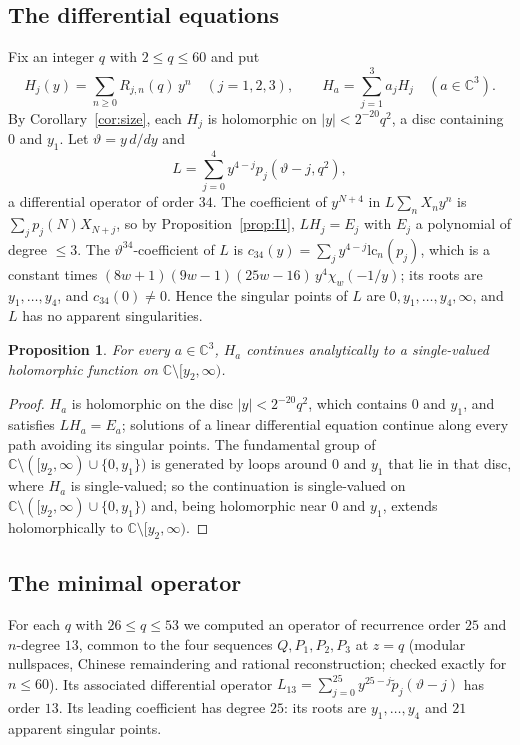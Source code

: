 \documentclass[11pt]{amsart}
\newtheorem{proposition}{Proposition}[section]
\theoremstyle{definition}
\theoremstyle{remark}
\numberwithin{equation}{section}
\newcommand{\CC}{\mathbb{C}}
\begin{document}
\subsection{The differential equations}
Fix an integer $q$ with $2\le q\le60$ and put
\[
H_j(y)=\sum_{n\ge0}R_{j,n}(q)\,y^n\quad(j=1,2,3),\qquad H_a=\sum_{j=1}^3a_jH_j\quad(a\in\CC^3).
\]
By Corollary~\ref{cor:size}, each $H_j$ is holomorphic on $|y|<2^{-20}q^2$, a disc containing $0$ and $y_1$. Let
$\vartheta=y\,d/dy$ and
\[
L=\sum_{j=0}^4y^{4-j}p_j(\vartheta-j,q^2),
\]
a differential operator of order $34$. The coefficient of $y^{N+4}$ in $L\sum_nX_ny^n$ is $\sum_jp_j(N)X_{N+j}$, so by
Proposition~\ref{prop:I1}, $LH_j=E_j$ with $E_j$ a polynomial of degree $\le3$. The $\vartheta^{34}$-coefficient of $L$
is $c_{34}(y)=\sum_jy^{4-j}\mathrm{lc}_n(p_j)$, which is a constant times $(8w+1)(9w-1)(25w-16)\,y^4\chi_w(-1/y)$; its
roots are $y_1,\dots,y_4$, and $c_{34}(0)\ne0$. Hence the singular points of $L$ are $0,y_1,\dots,y_4,\infty$, and $L$ has
no apparent singularities.

\begin{proposition}\label{prop:continuation}
For every $a\in\CC^3$, $H_a$ continues analytically to a single-valued holomorphic function on $\CC\setminus[y_2,\infty)$.
\end{proposition}

\begin{proof}
$H_a$ is holomorphic on the disc $|y|<2^{-20}q^2$, which contains $0$ and $y_1$, and satisfies $LH_a=E_a$; solutions of a
linear differential equation continue along every path avoiding its singular points. The fundamental group of
$\CC\setminus([y_2,\infty)\cup\{0,y_1\})$ is generated by loops around $0$ and $y_1$ that lie in that disc, where $H_a$ is
single-valued; so the continuation is single-valued on $\CC\setminus([y_2,\infty)\cup\{0,y_1\})$ and, being holomorphic
near $0$ and $y_1$, extends holomorphically to $\CC\setminus[y_2,\infty)$.
\end{proof}

\subsection{The minimal operator}
For each $q$ with $26\le q\le53$ we computed an operator of recurrence order $25$ and $n$-degree $13$, common to the four
sequences $Q,P_1,P_2,P_3$ at $z=q$ (modular nullspaces, Chinese remaindering and rational reconstruction; checked
exactly for $n\le60$). Its associated differential operator $L_{13}=\sum_{j=0}^{25}y^{25-j}\tilde p_j(\vartheta-j)$ has
order $13$. Its leading coefficient has degree $25$: its roots are $y_1,\dots,y_4$ and $21$ apparent singular points.
\end{document}
